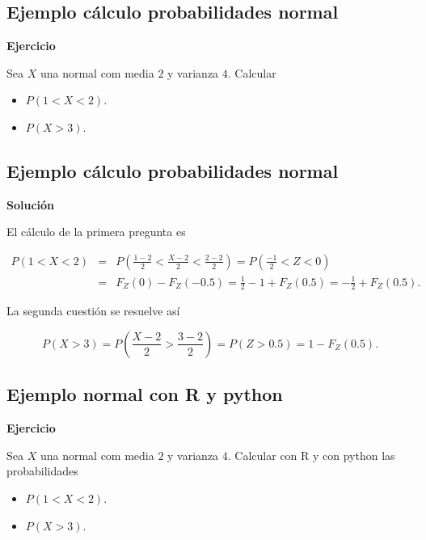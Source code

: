 \documentclass[]{book}
\providecommand{\tightlist}{%
  \setlength{\itemsep}{0pt}\setlength{\parskip}{0pt}}
\begin{document}
\hypertarget{ejemplo-cuxe1lculo-probabilidades-normal}{%
\subsection{Ejemplo cálculo probabilidades normal}\label{ejemplo-cuxe1lculo-probabilidades-normal}}

\textbf{Ejercicio}

Sea \(X\) una normal com media \(2\) y varianza \(4\). Calcular

\begin{itemize}
\tightlist
\item
  \(P(1< X< 2).\)
\item
  \(P(X>3).\)
\end{itemize}

\hypertarget{ejemplo-cuxe1lculo-probabilidades-normal-1}{%
\subsection{Ejemplo cálculo probabilidades normal}\label{ejemplo-cuxe1lculo-probabilidades-normal-1}}

\textbf{Solución}

El cálculo de la primera pregunta es

\begin{eqnarray*}
P(1< X< 2)&=& P\left(\frac{1-2}{2}<\frac{X-2}{2}<\frac{2-2}{2}\right)= P\left(\frac{-1}{2}<Z<0\right)\\
&=& F_{Z}(0)-F_{Z}(-0.5)=\frac12-1+F_{Z}(0.5)=-\frac12+F_Z(0.5).
\end{eqnarray*}

La segunda cuestión se resuelve así

\[
P(X>3)=P\left(\frac{X-2}2>\frac{3-2}{2}\right)=P(Z>0.5)=1-F_{Z}(0.5).
\]

\hypertarget{ejemplo-normal-con-r-y-python}{%
\subsection{Ejemplo normal con R y python}\label{ejemplo-normal-con-r-y-python}}

\textbf{Ejercicio}

Sea \(X\) una normal com media \(2\) y varianza \(4\). Calcular con R y con python las probabilidades

\begin{itemize}
\tightlist
\item
  \(P(1< X< 2).\)
\item
  \(P(X>3).\)
\end{itemize}
\end{document}
